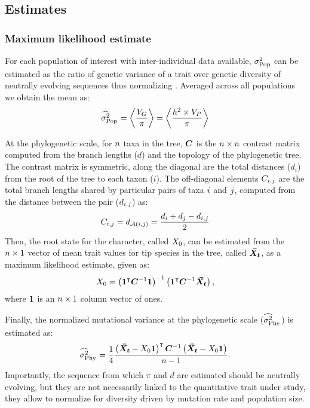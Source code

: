 \documentclass{article}
\begin{document}
\subsection{Estimates}

\subsubsection{Maximum likelihood estimate}
For each population of interest with inter-individual data available, $\sigma^2_{\text{Pop}}$ can be estimated as the ratio of genetic variance of a trait over genetic diversity of neutrally evolving sequences thus normalizing .
Averaged across all populations we obtain the mean as:
\begin{gather}
    \EstRatePop = \left< \frac{\VarGenetic}{\pi} \right> = \left< \frac{h^2 \Multiply \VarPhenotype }{\pi } \right> \label{eq:estimated-rate-pop}
\end{gather}

At the phylogenetic scale, for $n$ taxa in the tree, $\bm{C}$ is the $n \times n$ contrast matrix computed from the branch lengths ($d$) and the topology of the phylogenetic tree.
The contrast matrix is symmetric, along the diagonal are the total distances ($d_{i}$) from the root of the tree to each taxon ($i$).
The off-diagonal elements $C_{i,j}$ are the total branch lengths shared by particular pairs of taxa $i$ and $j$, computed from the distance between the pair ($d_{i,j}$) as:
\begin{gather}
    C_{i,j} = d_{\mathcal{A}(i, j)} = \frac{d_{i} + d_{j} - d_{i,j}}{2}
\end{gather}
Then, the root state for the character, called $X_{0}$, can be estimated from the $n \times 1$ vector of mean trait values for tip species in the tree, called $\bm{\bar{X_{t}}}$, as a maximum likelihood estimate\cite{omeara_testing_2006}, given as:
\begin{gather}
    X_{0} = \left( \bm{1}^{\intercal} \bm{C}^{-1} \bm{1} \right)^{-1} \left( \bm{1}^{\intercal} \bm{C}^{-1} \bm{\bar{X_{t}}} \right), \label{eq:estimated-root-trait}
\end{gather}
where $\bm{1}$ is an $n \times 1$ column vector of ones.

Finally, the normalized mutational variance at the phylogenetic scale ($\EstRatePhy$) is estimated\cite{omeara_testing_2006} as:
\begin{gather}
    \EstRatePhy = \frac{1}{4}\frac{\left( \VecTrait -  \RootTrait \VecOne \right)\tr \Cr\inv \left( \VecTrait -  \RootTrait  \VecOne  \right)}{\NbrSpecies - 1}. \label{eq:estimated-rate-phy}
\end{gather}
Importantly, the sequence from which $\pi$ and $d$ are estimated should be neutrally evolving, but they are not necessarily linked to the quantitative trait under study, they allow to normalize for diversity driven by mutation rate and population size.
\end{document}
